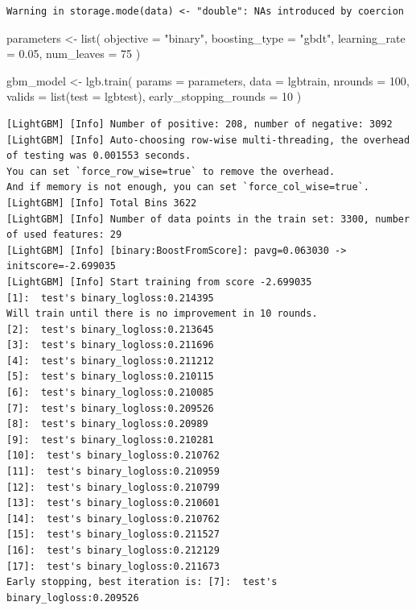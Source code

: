 \documentclass[
  letterpaper,
  DIV=11,
  numbers=noendperiod]{scrartcl}
\newenvironment{Shaded}{\begin{snugshade}}{\end{snugshade}}
\newcommand{\AttributeTok}[1]{\textcolor[rgb]{0.40,0.45,0.13}{#1}}
\newcommand{\DecValTok}[1]{\textcolor[rgb]{0.68,0.00,0.00}{#1}}
\newcommand{\FloatTok}[1]{\textcolor[rgb]{0.68,0.00,0.00}{#1}}
\newcommand{\FunctionTok}[1]{\textcolor[rgb]{0.28,0.35,0.67}{#1}}
\newcommand{\NormalTok}[1]{\textcolor[rgb]{0.00,0.23,0.31}{#1}}
\newcommand{\OtherTok}[1]{\textcolor[rgb]{0.00,0.23,0.31}{#1}}
\newcommand{\StringTok}[1]{\textcolor[rgb]{0.13,0.47,0.30}{#1}}
\begin{document}
\begin{verbatim}
Warning in storage.mode(data) <- "double": NAs introduced by coercion
\end{verbatim}

\begin{Shaded}
\begin{Highlighting}[]
\NormalTok{parameters }\OtherTok{\textless{}{-}} \FunctionTok{list}\NormalTok{(}
  \AttributeTok{objective =} \StringTok{"binary"}\NormalTok{,}
  \AttributeTok{boosting\_type =} \StringTok{"gbdt"}\NormalTok{,}
  \AttributeTok{learning\_rate =} \FloatTok{0.05}\NormalTok{,}
  \AttributeTok{num\_leaves =} \DecValTok{75}
\NormalTok{)}
\end{Highlighting}
\end{Shaded}

\begin{Shaded}
\begin{Highlighting}[]
\NormalTok{gbm\_model }\OtherTok{\textless{}{-}} \FunctionTok{lgb.train}\NormalTok{(}
  \AttributeTok{params =}\NormalTok{ parameters,}
  \AttributeTok{data =}\NormalTok{ lgbtrain,}
  \AttributeTok{nrounds =} \DecValTok{100}\NormalTok{,}
  \AttributeTok{valids =} \FunctionTok{list}\NormalTok{(}\AttributeTok{test =}\NormalTok{ lgbtest),}
  \AttributeTok{early\_stopping\_rounds =} \DecValTok{10}
\NormalTok{)}
\end{Highlighting}
\end{Shaded}

\begin{verbatim}
[LightGBM] [Info] Number of positive: 208, number of negative: 3092
[LightGBM] [Info] Auto-choosing row-wise multi-threading, the overhead of testing was 0.001553 seconds.
You can set `force_row_wise=true` to remove the overhead.
And if memory is not enough, you can set `force_col_wise=true`.
[LightGBM] [Info] Total Bins 3622
[LightGBM] [Info] Number of data points in the train set: 3300, number of used features: 29
[LightGBM] [Info] [binary:BoostFromScore]: pavg=0.063030 -> initscore=-2.699035
[LightGBM] [Info] Start training from score -2.699035
[1]:  test's binary_logloss:0.214395 
Will train until there is no improvement in 10 rounds.
[2]:  test's binary_logloss:0.213645 
[3]:  test's binary_logloss:0.211696 
[4]:  test's binary_logloss:0.211212 
[5]:  test's binary_logloss:0.210115 
[6]:  test's binary_logloss:0.210085 
[7]:  test's binary_logloss:0.209526 
[8]:  test's binary_logloss:0.20989 
[9]:  test's binary_logloss:0.210281 
[10]:  test's binary_logloss:0.210762 
[11]:  test's binary_logloss:0.210959 
[12]:  test's binary_logloss:0.210799 
[13]:  test's binary_logloss:0.210601 
[14]:  test's binary_logloss:0.210762 
[15]:  test's binary_logloss:0.211527 
[16]:  test's binary_logloss:0.212129 
[17]:  test's binary_logloss:0.211673 
Early stopping, best iteration is: [7]:  test's binary_logloss:0.209526
\end{verbatim}
\end{document}
